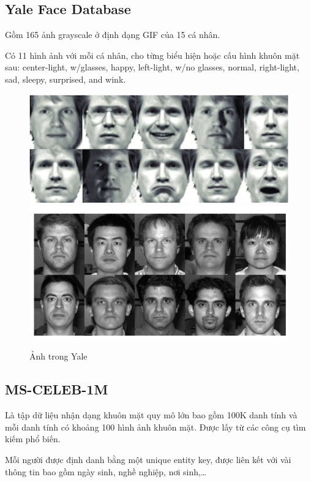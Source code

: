\documentclass[a4paper, 12pt]{article}
\begin{document}
\subsection{Yale Face Database}
Gồm 165 ảnh grayscale ở định dạng GIF của 15 cá nhân.

Có 11 hình ảnh với mỗi cá nhân, cho từng biểu hiện hoặc cấu hình khuôn mặt sau: center-light, w/glasses, happy, left-light, w/no glasses, normal, right-light, sad, sleepy, surprised, and wink.

    \begin{figure}[H]
        \begin{center}
            \includegraphics[scale=0.542]{img/Yale1.png}
            \includegraphics[scale=0.5]{img/Yale2.png}
            \caption{Ảnh trong Yale}
        \end{center}
    \end{figure}
\subsection{MS-CELEB-1M}
Là tập dữ liệu nhận dạng khuôn mặt quy mô lớn bao gồm 100K danh tính và mỗi danh tính có khoảng 100 hình ảnh khuôn mặt. Được lấy từ các công cụ tìm kiếm phổ biến.

Mỗi người được định danh bằng một unique entity key, được liên kết với vài thông tin bao gồm ngày sinh, nghề nghiệp, nơi sinh,…
\end{document}
